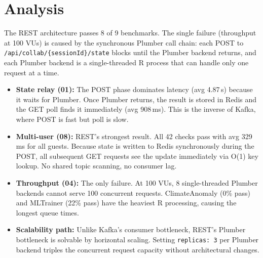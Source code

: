 \documentclass[11pt,a4paper]{article}
\begin{document}
\section{Analysis}

The REST architecture passes 8 of 9 benchmarks. The single failure
(throughput at 100 VUs) is caused by the synchronous Plumber call chain:
each POST to \texttt{/api/collab/\{sessionId\}/state} blocks until the
Plumber backend returns, and each Plumber backend is a single-threaded
R process that can handle only one request at a time.

\begin{itemize}
  \item \textbf{State relay (01):} The POST phase dominates latency
        (avg 4.87\,s) because it waits for Plumber. Once Plumber returns,
        the result is stored in Redis and the GET poll finds it
        immediately (avg 908\,ms). This is the inverse of Kafka, where
        POST is fast but poll is slow.
  \item \textbf{Multi-user (08):} REST's strongest result. All 42 checks
        pass with avg 329\,ms for all guests. Because state is written
        to Redis synchronously during the POST, all subsequent GET
        requests see the update immediately via O(1) key lookup.
        No shared topic scanning, no consumer lag.
  \item \textbf{Throughput (04):} The only failure. At 100 VUs,
        8 single-threaded Plumber backends cannot serve 100 concurrent
        requests. ClimateAnomaly (0\% pass) and MLTrainer (22\% pass)
        have the heaviest R processing, causing the longest queue times.
  \item \textbf{Scalability path:} Unlike Kafka's consumer bottleneck,
        REST's Plumber bottleneck is solvable by horizontal scaling.
        Setting \texttt{replicas: 3} per Plumber backend triples the
        concurrent request capacity without architectural changes.
\end{itemize}
\end{document}
